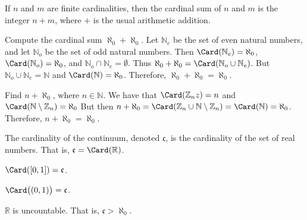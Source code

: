 \documentclass[crop=false,class=book,oneside]{standalone}
\begin{document}
            \begin{theorem*}
                If $n$ and $m$ are finite cardinalities,
                then the cardinal sum of $n$ and $m$ is the
                integer $n+m$, where $+$ is the usual
                arithmetic addition.
            \end{theorem*}
            \begin{example}
                Compute the cardinal sum
                $\aleph_{0}+\aleph_{0}$. Let
                $\mathbb{N}_{e}$ be the set of even natural
                numbers, and let $\mathbb{N}_{o}$ be the set
                of odd natural numbers. Then
                $\Card(\mathbb{N}_{e})=\aleph_{0}$,
                $\Card(\mathbb{N}_{o})=\aleph_{0}$, and
                ${\mathbb{N}_{o}}\cap{\mathbb{N}_{e}}=\emptyset$.
                Thus
                $\aleph_{0}+\aleph_{0}%
                 =\Card({\mathbb{N}_{o}}\cup{\mathbb{N}_{e}})$.
                But
                ${\mathbb{N}_{o}}\cup{\mathbb{N}_{e}}%
                 =\mathbb{N}$ and $\Card(\mathbb{N})=\aleph_{0}$.
                Therefore, $\aleph_{0}+\aleph_{0}=\aleph_{0}$.
            \end{example}
            \begin{example}
                Find $n+\aleph_{0}$, where $n\in\mathbb{N}$.
                We have that
                $\Card(\mathbb{Z}_{n}z)=n$ and
                $\Card(\mathbb{N}\setminus\mathbb{Z}_{n})%
                 =\aleph_{0}$
                But then
                $n+\aleph_{0}=%
                 \Card(\mathbb{Z}_{n}\cup%
                 \mathbb{N}\setminus\mathbb{Z}_{n})%
                 =\Card(\mathbb{N})=\aleph_{0}$.
                Therefore, $n+\aleph_{0}=\aleph_{0}$.
            \end{example}
            \begin{definition}
                The cardinality of the continuum,
                denoted $\mathfrak{c}$, is the
                cardinality of the set of real numbers.
                That is, $\mathfrak{c}=\Card(\mathbb{R})$.
            \end{definition}
            \begin{theorem*}
                $\Card([0,1])=\mathfrak{c}$.
            \end{theorem*}
            \begin{theorem*}
                $\Card\big((0,1)\big)=\mathfrak{c}$.
            \end{theorem*}
            \begin{theorem*}
                $\mathbb{R}$ is uncountable. That is,
                $\mathfrak{c}>\aleph_{0}$.
            \end{theorem*}
\end{document}

